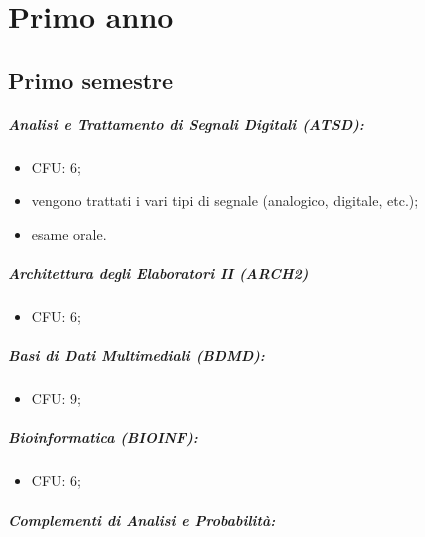 \chapter{Primo anno}

\section{Primo semestre}  

\paragraph{Analisi e Trattamento di Segnali Digitali (ATSD):}

\begin{itemize}
  \item CFU: 6;
  \item vengono trattati i vari tipi di segnale (analogico, digitale, etc.);
  \item esame orale.
\end{itemize}

\paragraph{Architettura degli Elaboratori II (ARCH2)}

\begin{itemize}
  \item CFU: 6;
\end{itemize}

\paragraph{Basi di Dati Multimediali (BDMD):}

\begin{itemize}
  \item CFU: 9;
\end{itemize}

\paragraph{Bioinformatica (BIOINF):}

\begin{itemize}
  \item CFU: 6;
\end{itemize}

\paragraph{Complementi di Analisi e Probabilità:}

